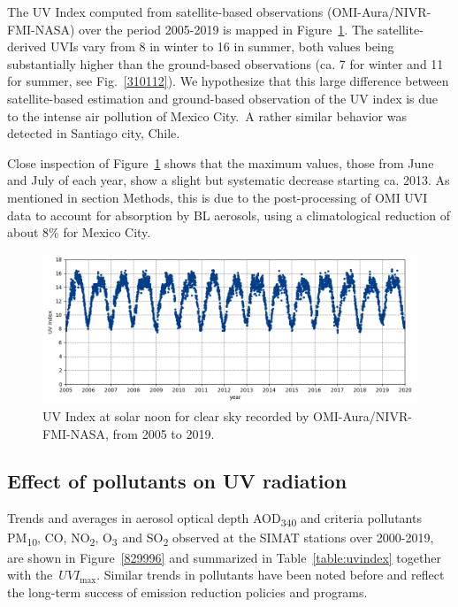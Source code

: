 \documentclass[journal=jacsat,manuscript=article]{achemso}
\begin{document}
The UV Index computed from satellite-based observations
(OMI-Aura/NIVR-FMI-NASA) over the period 2005-2019 is mapped in
Figure~{\ref{485116}}. The satellite-derived UVIs vary
from 8 in winter to 16 in summer, both values being substantially higher
than the ground-based observations (ca. 7 for winter and 11 for summer,
see Fig.~{\ref{310112}}). We hypothesize that this
large difference between satellite-based estimation and ground-based
observation of the UV index is due to the intense air pollution of
Mexico City.~A rather similar behavior was detected in Santiago city,
Chile.\citep{Cabrera_2012}

Close inspection of Figure~{\ref{485116}} shows that
the maximum values, those from June and July of each year, show a slight
but systematic decrease starting ca. 2013. As mentioned in
section Methods, this is due to the post-processing of
OMI UVI data to account for absorption by BL aerosols\citep{Arola_2009},
using a climatological reduction of about 8\% for Mexico City.

\begin{figure}[H]
  \begin{center}
    \includegraphics[width=0.70\columnwidth]{figures/CSUVindex}
    \caption{{UV Index at solar noon for clear sky recorded by OMI-Aura/NIVR-FMI-NASA,
          from 2005 to 2019.
            {\label{485116}}%
        }}
  \end{center}
\end{figure}


\subsection{Effect of pollutants on UV radiation}

Trends and averages in aerosol optical depth AOD\textsubscript{340} and
criteria pollutants PM\textsubscript{10}, CO, NO\textsubscript{2},
O\textsubscript{3~}and SO\textsubscript{2} observed at the SIMAT
stations over 2000-2019, are shown in
Figure~{\ref{829996}} and summarized in
Table~{\ref{table:uvindex}} together with
the~\(UVI_{\max}\). Similar trends in pollutants have been noted
before\citep{Parrish_2011,aire_cmdx_2017,Molina_2019}
and reflect the long-term success of
emission reduction policies and programs.
\end{document}
